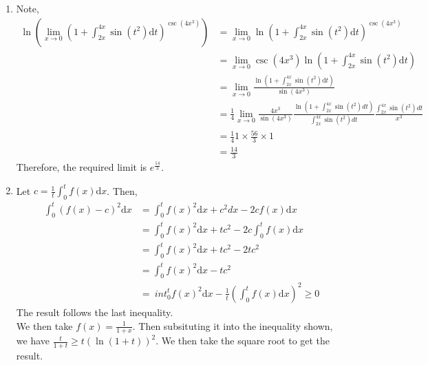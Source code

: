 \documentclass[12pt]{article}
\newcommand{\diff}{\mathrm{d}}
\theoremstyle{definition}
\begin{document}
\begin{enumerate}
\begin{enumerate}
    \item Note,
    \begin{align*}
    \ln (\lim_{x\to 0}(1+\int_{2x}^{4x}\sin(t^2)\diff t)^{\csc(4x^3)})&=\lim_{x\to 0}\ln(1+\int_{2x}^{4x}\sin(t^2)\diff t)^{\csc(4x^3)}\\ 
    &= \lim_{x\to 0}\csc(4x^3)\ln(1+\int_{2x}^{4x}\sin(t^2)\diff t)\\
    &=\lim_{x\to 0}\frac{\ln(1+\int_{2x}^{4x}\sin(t^2)\diff t)}{\sin (4x^3)}\\
    &=\frac{1}{4} \lim_{x\to 0} \frac{4x^{3}}{\sin(4x^{3})}\frac{\ln \left(1+\int_{2x}^{4x} \sin(t^{2})dt\right)}{\int_{2x}^{4x}\sin(t^{2})dt}\frac{\int_{2x}^{4x}\sin(t^{2})dt}{x^{3}}\\
    &=\frac{1}{4}1\times\frac{56}{3}\times 1\\
    &=\frac{14}{3}
    \end{align*}
    Therefore, the required limit is $e^\frac{14}{3}$.
    \item Let $c=\frac{1}{t}\int_0^t f(x)\diff x$. Then,
    \begin{align*}
    \int_0^t \left(f(x) -c\right)^2 \diff x &= \int_0^t f(x)^2\diff x + c^2dx -2cf(x)\diff x \\
    &= \int_0^t f(x)^2\diff x + tc^2 - 2c\int_0^t f(x)\diff x\\
    &= \int_0^t f(x)^2\diff x + tc^2 -2tc^2  \\ 
    &= \int_0^t f(x)^2\diff x - tc^2\\
    &=\ int_0^t f(x)^2\diff x -\frac{1}{t}(\int_0^tf(x)\diff x)^2\geq 0
    \end{align*}
    The result follows the last inequality.\\
    We then take $f(x)=\frac{1}{1+x}$. Then subsituting it into the inequality shown, we have $\frac{t}{1+t}\geq t(\ln(1+t))^2$. We then take the square root to get the result.
  \end{enumerate}
\end{enumerate}
\end{document}
